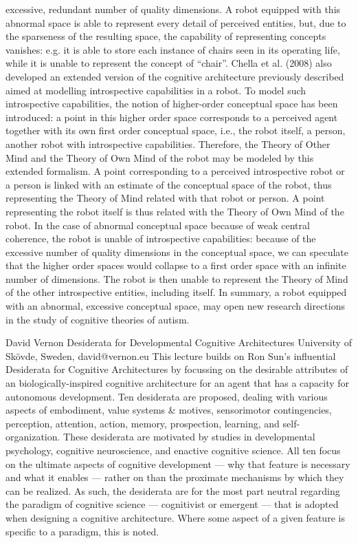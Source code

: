 \documentclass[10pt,fleqn,openany]{book} %
\begin{document}
\begin{enumerate}
{excessive, redundant number of quality dimensions. A robot equipped with this abnormal space is able to represent every detail of perceived entities, but, due to the sparseness of the resulting space, the capability of representing concepts vanishes: e.g. it is able to store each instance of chairs seen in its operating life, while it is unable to represent the concept of “chair”. Chella et al. (2008) also developed an extended version of the cognitive architecture previously described aimed at modelling introspective capabilities in a robot. To model such introspective capabilities, the notion of higher-order conceptual space has been introduced: a point in this higher order space corresponds to a perceived agent together with its own first order conceptual space, i.e., the robot itself, a person, another robot with introspective capabilities. Therefore, the Theory of Other Mind and the Theory of Own Mind of the robot may be modeled by this extended formalism. A point corresponding to a perceived introspective robot or a person is linked with an estimate of the conceptual space of the robot, thus representing the Theory of Mind related with that robot or person. A point representing the robot itself is thus related with the Theory of Own Mind of the robot. In the case of abnormal conceptual space because of weak central coherence, the robot is unable of introspective capabilities: because of the excessive number of quality dimensions in the conceptual space, we can speculate that the higher order spaces would collapse to a first order space with an infinite number of dimensions. The robot is then unable to represent the Theory of Mind of the other introspective entities, including itself. In summary, a robot equipped with an abnormal, excessive conceptual space, may open new research directions in the study of cognitive theories of autism.}
		
	\paperabstract
		{David Vernon}
		{Desiderata for Developmental Cognitive Architectures}
		{University of Skövde, Sweden, david@vernon.eu}
		{
			This lecture builds on Ron Sun’s influential Desiderata for Cognitive Architectures by focussing on the desirable attributes of an biologically-inspired cognitive architecture for an agent that has a capacity for autonomous development. Ten desiderata are proposed, dealing with various aspects of embodiment, value systems \& motives, sensorimotor contingencies, perception, attention, action, memory, prospection, learning, and self-organization. These desiderata are motivated by studies in developmental psychology, cognitive neuroscience, and enactive cognitive science. All ten focus on the ultimate aspects of cognitive development — why that feature is necessary and what it enables — rather on than the proximate mechanisms by which they can be realized. As such, the desiderata are for the most part neutral regarding the paradigm of cognitive science — cognitivist or emergent — that is adopted when designing a cognitive architecture. Where some aspect of a given feature is specific to a paradigm, this is noted.}
		

\end{enumerate}
\end{document}
